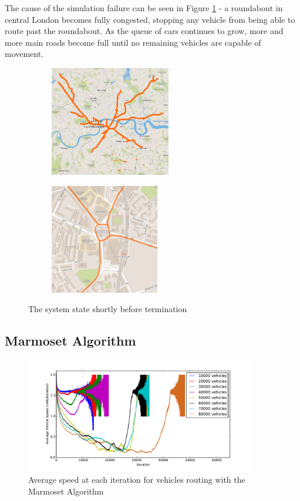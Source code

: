 \documentclass[ %
                    author={Alexander Hill},
                supervisor={Dr. Benjamin Sach},
                    degree={MEng},
                     title={MARMOSET},
                  subtitle={Multi-Agent Route Management using Online Simulation for Efficient Transportation},
                      type={research},
                      year={2016} ]{dissertation}
\begin{document}
The cause of the simulation failure can be seen in Figure \ref{fig:dijkstra-wtf}
- a roundabout in central London becomes fully congested, stopping any vehicle
from being able to route past the roundabout. As the queue of cars continues to
grow, more and more main roads become full until no remaining vehicles are
capable of movement.

\begin{figure}[h]
\centering
\begin{subfigure}[b]{0.4\textwidth}
    \centering
    \includegraphics[height=13em]{dij-60k-blocked-wide}
\end{subfigure}
\hspace{1em}
\begin{subfigure}[b]{0.4\textwidth}
    \centering
    \includegraphics[height=13em]{dij-60k-blocked-close}
\end{subfigure}
\caption{The system state shortly before termination}\label{fig:dijkstra-wtf}
\end{figure}

\subsection{Marmoset Algorithm}\label{sec:marmoset-eval}

\begin{figure}[p]
    \centering
    \includegraphics[width=0.9\textwidth]{sdv-speed}
    \caption{Average speed at each iteration for vehicles routing with the Marmoset Algorithm}\label{fig:sdv-speed}
\end{figure}
\end{document}
